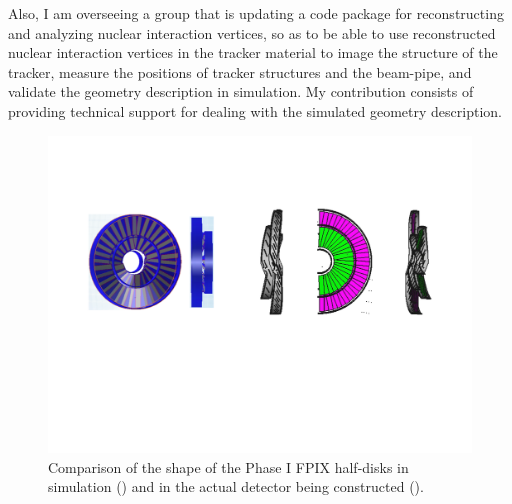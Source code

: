 Also, I am overseeing a group that is updating a code package for reconstructing and analyzing nuclear interaction vertices, so as to be able to use reconstructed nuclear interaction vertices in the tracker material to image the structure of the tracker, measure the positions of tracker structures and the beam-pipe, and validate the geometry description in simulation. My contribution consists of providing technical support for dealing with the simulated geometry description.

\begin{figure}[hbtp]
  \begin{center}
    \includegraphics[width=2.0\cmsFigWidth]{figures/phaseI_diskcomparison}
    \caption{Comparison of the shape of the Phase I FPIX half-disks in simulation (\cmsLeft) and in the actual detector being constructed (\cmsRight).}
    \label{fig:phaseI_diskcomparison}
  \end{center}
\end{figure}

